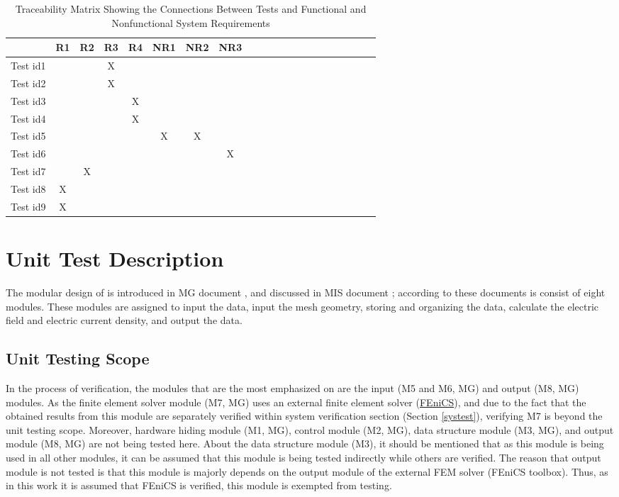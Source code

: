 \documentclass[12pt, titlepage]{article}
\begin{document}
\begin{table}[h!]
	\centering
	\begin{tabular}{|c|c|c|c|c|c|c|c|c|c|c|c|c|c|c|c|c|c|c|c|c|}
		\hline        
		& R1 & R2 & R3 & R4 & NR1 & NR2 & NR3 \\
		\hline
		Test id1        & & &X& & & &   \\ \hline
		Test id2        & & &X& & & &   \\ \hline
		Test id3        & & & &X& & &   \\ \hline
		Test id4        & & & &X& & & \\ \hline
		Test id5        & & & & &X&X&   \\ \hline
		Test id6        & & & & & & &X \\ \hline
		Test id7        & &X& & & & &   \\ \hline
		Test id8        &X& & & & & &   \\ \hline
		Test id9        &X& & & & & &  \\ \hline
		\end{tabular}
\caption{Traceability Matrix Showing the Connections Between Tests and Functional and Nonfunctional System Requirements}
\label{Table:A_trace}
\end{table}

\section{Unit Test Description} \label{utest}

The modular design of \progname{} is introduced in MG document \citep{MGSPDFMdoc74:online}, and discussed in MIS document \citep{MISSPDFMdoc81:online}; according to these documents \progname{} is consist of eight modules. These modules are assigned to input the data, input the mesh geometry, storing and organizing the data, calculate the electric field and electric current density, and output the data. 

\subsection{Unit Testing Scope}


In the process of \progname{} verification, the modules that are the most emphasized on are the input (M5 and M6, MG) and output (M8, MG) modules. As the finite element solver module (M7, MG) uses an external finite element solver (\href{www.fenics.org}{FEniCS}), and due to the fact that the obtained results from this module are separately verified within system verification section (Section \ref{systest}), verifying M7 is beyond the unit testing scope. Moreover, hardware hiding module (M1, MG), \progname{} control module (M2, MG), data structure module (M3, MG), and output module (M8, MG) are not being tested here. About the data structure module (M3), it should be mentioned that as this module is being used in all other modules, it can be assumed that this module is being tested indirectly while others are verified. The reason that output module is not tested is that this module is majorly depends on the output module of the external FEM solver (FEniCS toolbox). Thus, as in this work it is assumed that FEniCS is verified, this module is exempted from testing.  
\end{document}
